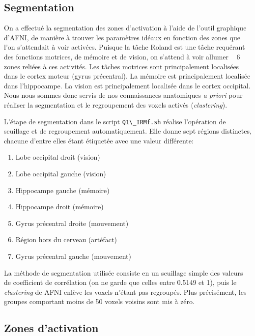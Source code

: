 \documentclass[a4paper]{article}
\begin{document}
\subsection{Segmentation \label{fmri_seg}}

On a effectué la segmentation des zones d'activation à l'aide de l'outil graphique d'AFNI, de manière à trouver les paramètres idéaux en fonction des zones que l'on s'attendait à voir activées. Puisque la tâche Roland est une tâche requérant des fonctions motrices, de mémoire et de vision, on s'attend à voir \og allumer \fg~ 6 zones reliées à ces activités. Les tâches motrices sont principalement localisées dans le cortex moteur (gyrus précentral). La mémoire est principalement localisée dans l'hippocampe. La vision est principalement localisée dans le cortex occipital. Nous nous sommes donc servis de nos connaissances anatomiques \emph{a priori} pour réaliser la segmentation et le regroupement des voxels activés (\emph{clustering}).

L'étape de segmentation dans le script \lstinline{Q1\_IRMf.sh} réalise l'opération de seuillage et de regroupement automatiquement. Elle donne sept régions distinctes, chacune d'entre elles étant étiquetée avec une valeur différente:
	
\begin{enumerate}
    \item Lobe occipital droit (vision)
    \item Lobe occipital gauche (vision)
    \item Hippocampe gauche (mémoire)
    \item Hippocampe droit (mémoire)
    \item Gyrus précentral droite (mouvement)
    \item Région hors du cerveau (artéfact)
    \item Gyrus précentral gauche (mouvement)
\end{enumerate}

La méthode de segmentation utilisée consiste en un seuillage simple des valeurs de coefficient de corrélation (on ne garde que celles entre 0.5149 et 1), puis le \emph{clustering} de AFNI enlève les voxels n'étant pas regroupés. Plus précisément, les groupes comportant moins de 50 voxels voisins sont mis à zéro.

\subsection{Zones d'activation}
\end{document}
